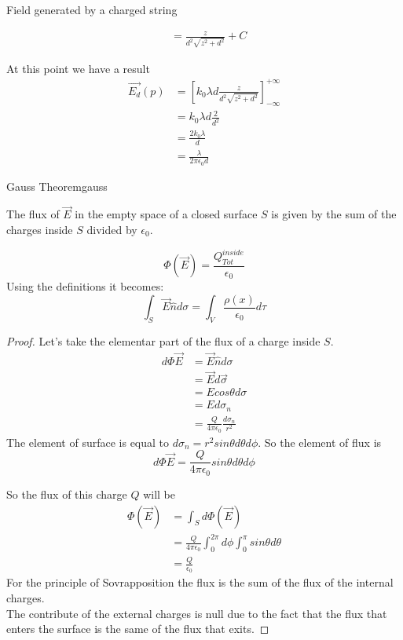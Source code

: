 \documentclass{article}
\begin{document}
\begin{xpl}{Field generated by a charged string}
\begin{note}
\begin{align*}
                                   &= \frac{z}{d^2\sqrt{z^2 + d^2}} + C
    \end{align*}
  \end{note}
  At this point we have a result
    \begin{align*}
      \overrightarrow{E_d}(p) &= [k_0 \lambda d \frac{z}{d^2\sqrt{z^2 + d^2}}]^{+\infty}_{-\infty}  \\ 
                              &= k_0 \lambda d \frac{2}{d^2} \\
                              &= \frac{2 k_0 \lambda }{d} \\ 
                              &= \frac{\lambda}{2 \pi \epsilon_0 d}
  \end{align*} 
\end{xpl}
\newpage{}
\begin{theo}{Gauss Theorem}{gauss}

  The flux of $\overrightarrow{E}$ in the empty space of a closed surface $S$ is given by the sum of 
  the charges inside $S$ divided by $\epsilon_0 $.

  $$ \Phi (\overrightarrow{E}) = \frac{Q^{inside}_{Tot}}{\epsilon_0 } $$
  Using the definitions it becomes: 
  $$ \int_S \overrightarrow{E} \hat{n} d\sigma = \int_{V} \frac{\rho(x)}{\epsilon_0 } d\tau $$ 
\end{theo}
\begin{proof}
  Let's take the elementar part of the flux of a charge inside $S$. 
  \begin{align*}
      d \Phi \overrightarrow{E} &= \overrightarrow{E} \hat{n} d\sigma \\
                                &= \overrightarrow{E} d\vec{\sigma} \\
                                &= E cos \theta d\sigma \\ 
                                &= E d\sigma_n \\ 
                                &= \frac{Q}{4\pi\epsilon_0}\frac{d\sigma_n}{r^2}
\end{align*}
The element of surface is equal to $d\sigma_n = r^2 sin \theta d\theta d\phi $. So the element of flux is 
$$ d\Phi\overrightarrow{E} =  \frac{Q}{4\pi\epsilon_0} sin\theta d\theta d\phi  $$

So the flux of this charge $Q$ will be 
\begin{align*}
  \Phi(\overrightarrow{E}) &= \int_S d\Phi (\overrightarrow{E}) \\ 
                        &= \frac{Q}{4\pi\epsilon_0}\int^{2\pi}_{0}d\phi \int^{\pi}_{0}sin\theta d\theta \\ 
                        &= \frac{Q}{\epsilon_0}
\end{align*}
For the principle of Sovrapposition the flux is the sum of the flux of the internal charges. \\ 
The contribute of the external charges is null due to the fact that the flux that enters the surface 
is the same of the flux that exits.

\end{proof}
\end{document}
